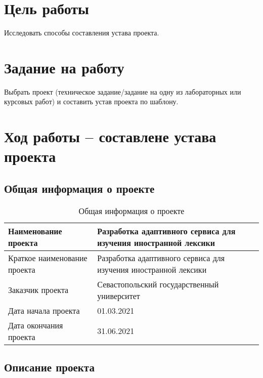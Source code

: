 \documentclass[a4paper,14pt]{extarticle}
\begin{document}


\section{Цель работы}
Исследовать способы составления устава проекта.

\section{Задание на работу}
Выбрать проект (техническое задание/задание на одну из лабораторных или курсовых
работ) и составить устав проекта по шаблону.

\section{Ход работы -- составлене устава проекта}
\subsection{Общая информация о проекте}

\begin{table}[H]
    \caption{Общая информация о проекте}
    \begin{tabular}{ | p{5.5cm} | p{11cm} | }
        \hline
        Наименование проекта & Разработка адаптивного сервиса для изучения иностранной лексики \\ \hline
        Краткое наименование проекта & Разработка адаптивного сервиса для изучения иностранной лексики \\ \hline
        Заказчик проекта & Севастопольский государственный университет \\ \hline
        Дата начала проекта & 01.03.2021 \\ \hline
        Дата окончания проекта & 31.06.2021 \\ \hline
    \end{tabular}
\end{table}

\subsection{Описание проекта}
\end{document}
